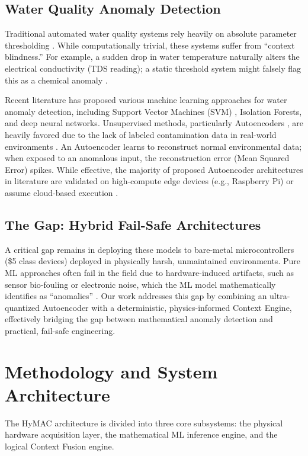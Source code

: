 \documentclass[runningheads]{llncs}
\begin{document}
\subsection{Water Quality Anomaly Detection}
Traditional automated water quality systems rely heavily on absolute parameter thresholding \cite{ref_geetha}. While computationally trivial, these systems suffer from ``context blindness.'' For example, a sudden drop in water temperature naturally alters the electrical conductivity (TDS reading); a static threshold system might falsely flag this as a chemical anomaly \cite{ref_antonelli}. 

Recent literature has proposed various machine learning approaches for water anomaly detection, including Support Vector Machines (SVM) \cite{ref_alfahdawi}, Isolation Forests, and deep neural networks. Unsupervised methods, particularly Autoencoders \cite{ref_sakurada}, are heavily favored due to the lack of labeled contamination data in real-world environments \cite{ref_yuan}. An Autoencoder learns to reconstruct normal environmental data; when exposed to an anomalous input, the reconstruction error (Mean Squared Error) spikes. While effective, the majority of proposed Autoencoder architectures in literature are validated on high-compute edge devices (e.g., Raspberry Pi) or assume cloud-based execution \cite{ref_singh}. 

\subsection{The Gap: Hybrid Fail-Safe Architectures}
A critical gap remains in deploying these models to bare-metal microcontrollers (\$5 class devices) deployed in physically harsh, unmaintained environments. Pure ML approaches often fail in the field due to hardware-induced artifacts, such as sensor bio-fouling or electronic noise, which the ML model mathematically identifies as ``anomalies'' \cite{ref_carvalho}. Our work addresses this gap by combining an ultra-quantized Autoencoder with a deterministic, physics-informed Context Engine, effectively bridging the gap between mathematical anomaly detection and practical, fail-safe engineering.

\section{Methodology and System Architecture}
\label{sec:methodology}
The HyMAC architecture is divided into three core subsystems: the physical hardware acquisition layer, the mathematical ML inference engine, and the logical Context Fusion engine. 
\end{document}
